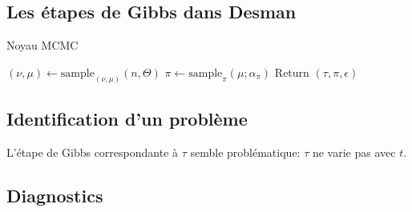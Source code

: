 \documentclass{beamer}
\newcommand{\code}[1]{\colorbox{light-gray}{\texttt{#1}}}
\newcommand{\fr}[1]{#1}
\newcommand{\en}[1]{}
\begin{document}
\subsection{Les étapes de Gibbs dans Desman}
\begin{frame}
    
\begin{algorithm}[H]
\caption{\en{MCMC kernel}\fr{Noyau MCMC}}\label{alg:mcmck}
\begin{algorithmic}
\State $(\nu,\mu)\gets{\mathrm{sample}_{(\nu,\mu)}(n,\Theta)}$
\State $\pi\gets\mathrm{sample}_\pi(\mu;\alpha_\pi)$
\State Return $\left(\tau,\pi,\epsilon\right)$
\EndProcedure
\end{algorithmic}
\end{algorithm}

\end{frame}

\subsection{Identification d'un problème}
\begin{frame}
L'étape de Gibbs correspondante à $\tau$ semble problématique: $\tau$ ne varie pas avec $t$.
\end{frame}


\subsection{Diagnostics}
\end{document}
